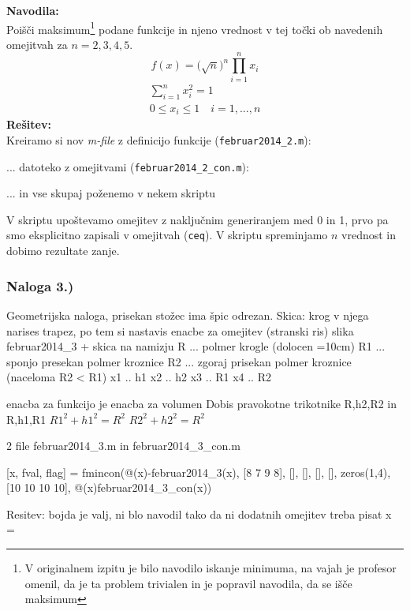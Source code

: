 \documentclass[a4paper,11pt]{article}
\begin{document}
\textbf{Navodila:} \\
Poišči maksimum\footnote{V originalnem izpitu je bilo navodilo iskanje minimuma, na vajah je profesor omenil, da je ta problem trivialen in je popravil navodila, da se išče maksimum} podane funkcije in njeno vrednost v tej točki ob navedenih omejitvah za $n=2,3,4,5$.
\begin{equation} 
f(x) = \big( \sqrt{n} \big)^{n} \prod_{i=1}^n x_i
\end{equation}
\begin{equation}
\begin{gathered}
	\sum_{i=1}^n x_i^2 = 1 \\
	0 \leq x_i \leq 1 \quad i=1, ..., n
\end{gathered}
\end{equation}
\textbf{Rešitev:} \\
Kreiramo si nov \textit{m-file} z definicijo funkcije (\texttt{februar2014\_2.m}):

... datoteko z omejitvami (\texttt{februar2014\_2\_con.m}):

... in vse skupaj poženemo v nekem skriptu

V skriptu upoštevamo omejitev z naključnim generiranjem med 0 in 1, prvo pa smo eksplicitno zapisali v omejitvah (\texttt{ceq}). V skriptu spreminjamo $n$ vrednost
in dobimo rezultate zanje.

\subsubsection{Naloga 3.)}

Geometrijska naloga, prisekan stožec ima špic odrezan. Skica: krog v njega narises trapez, po tem si nastavis enacbe za omejitev (stranski ris) slika februar2014\_3 + skica na namizju
R ... polmer krogle (dolocen  =10cm)
R1 ... sponjo presekan polmer kroznice
R2 ... zgoraj prisekan polmer kroznice (naceloma R2 < R1)
x1 .. h1
x2 .. h2
x3 .. R1
x4 .. R2

enacba za funkcijo je enacba za volumen
Dobis pravokotne trikotnike R,h2,R2 in R,h1,R1
$R1^2 + h1^2 = R^2$
$R2^2 + h2^2 = R^2$

2 file februar2014\_3.m in februar2014\_3\_con.m

[x, fval, flag] = fmincon(@(x)-februar2014\_3(x), [8 7 9 8], [], [], [], [], zeros(1,4), [10 10 10 10], @(x)februar2014\_3\_con(x))

Resitev:   bojda je valj, ni blo navodil tako da ni dodatnih omejitev treba pisat
x =
\end{document}
